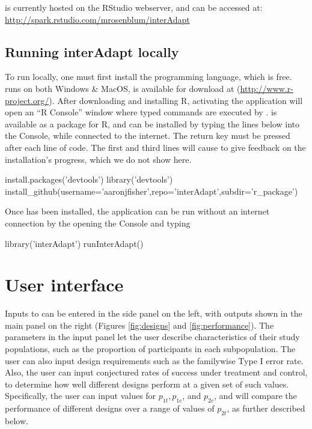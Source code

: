 \documentclass[article]{jss}
\begin{document}
 is currently hosted on the RStudio webserver, and can be accessed at:\\
\url{http://spark.rstudio.com/mrosenblum/interAdapt}

\subsection{Running interAdapt locally}
\label{sub:running-locally}



To run  locally, one must first install the  programming language, which is free.  runs on both Windows \& MacOS, is available for download at (\url{http://www.r-project.org/}). After downloading and installing R, activating the  application will open an ``R Console'' window where typed commands are executed by .  is available as a package for R, and can be installed by typing the lines below into the  Console, while connected to the internet. The return key must be pressed after each line of code. The first and third lines will cause  to give feedback on the installation's progress, which we do not show here.

\vspace{5 mm}
\begin{Code}
install.packages('devtools')
library('devtools')
install_github(username='aaronjfisher',repo='interAdapt',subdir='r_package')
\end{Code}
\vspace{5 mm}

Once  has been installed, the application can be run without an internet connection by the opening the  Console and typing

\vspace{5 mm}
\begin{Code}
library('interAdapt')
runInterAdapt()
\end{Code}
\vspace{5 mm}




\section{User interface}
\label{sec:UI}

Inputs to  can be entered in the side panel on the left, with outputs shown in the main panel on the right (Figures \ref{fig:designs} and \ref{fig:performance}). The parameters in the input panel let the user describe characteristics of their study populations, such as the proportion of participants in each subpopulation. 
The user can also input design requirements such as  the  familywise Type I error rate. Also, the user can input conjectured rates of success under treatment and control, to determine how well different designs perform at a given set of such values. Specifically, the user can input values for $p_{1t},p_{1c}$, and $p_{2c}$, and   will compare the performance of different designs  over a range of values of $p_{2t}$, as further described below.
\end{document}
